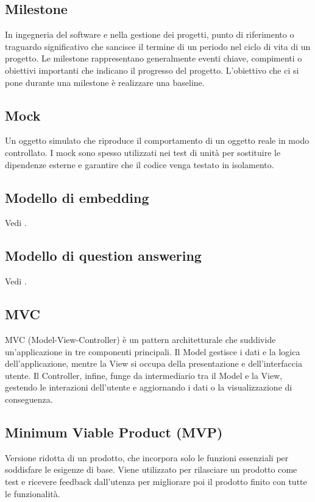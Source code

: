 \subsection*{Milestone}
In ingegneria del software e nella gestione dei progetti, punto di riferimento o traguardo significativo che sancisce il termine di un periodo nel ciclo 
di vita di un progetto. Le milestone rappresentano generalmente eventi chiave, compimenti o obiettivi importanti che indicano il progresso del progetto. 
L’obiettivo che ci si pone durante una milestone è realizzare una baseline.

\hypertarget{sec:mock}{}
\subsection*{Mock}
Un oggetto simulato che riproduce il comportamento di un oggetto reale in modo controllato. I mock sono spesso utilizzati nei test di unità per sostituire
le dipendenze esterne e garantire che il codice venga testato in isolamento.

\hypertarget{sec:modello_di_embedding}{}
\subsection*{Modello di embedding}
Vedi .

\hypertarget{sec:modello_di_question_answering}{}
\subsection*{Modello di question answering}
Vedi .

\hypertarget{sec:MVC}{}
\subsection*{MVC}
MVC (Model-View-Controller) è un pattern architetturale che suddivide un'applicazione in tre componenti principali.
Il Model gestisce i dati e la logica dell'applicazione, mentre la View si occupa della presentazione e dell'interfaccia utente. 
Il Controller, infine, funge da intermediario tra il Model e la View, gestendo le interazioni dell'utente e aggiornando i dati o la visualizzazione di conseguenza.

\hypertarget{sec:MVP}{}
\subsection*{Minimum Viable Product (MVP)}
Versione ridotta di un prodotto, che incorpora solo le funzioni essenziali per soddisfare le esigenze di base. Viene utilizzato per rilasciare un prodotto 
come test e ricevere feedback dall’utenza per migliorare poi il prodotto finito con tutte le funzionalità.

